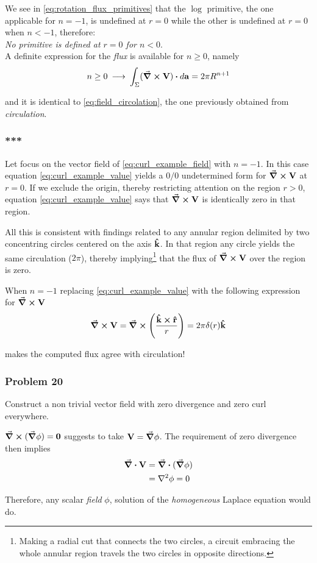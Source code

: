 We see in \ref{eq:rotation_flux_primitives} that the $\log$  primitive, the one applicable for $n = -1$, is  undefined at $r=0$ while the other is undefined at $r=0$ when $n < -1$, therefore:\\

\textit{No primitive is defined at $r=0$ for $n < 0$}. \\ 

A definite expression for the \textit{flux} is available for $n \geq 0$, namely 
\begin{equation}
n \geq 0 \: \longrightarrow \: \int_{\Sigma} (\curl{\vb{V}}) \vdot d\vb{a} = 2\pi R^{n+1} 
\label{eq:flux}
\end{equation}

and it is identical to \ref{eq:field_circolation}, the one previously obtained from \textit{circulation}. 

\subsubsection*{***}
Let focus on the vector field of \ref{eq:curl_example_field} with $n = -1$. In this case equation \ref{eq:curl_example_value} yields a $0/0$ undetermined form for $\curl{\vb{V}}$ at $r=0$. If we exclude the origin, thereby restricting attention on the region $r > 0$, equation \ref{eq:curl_example_value} says that $\curl{\vb{V}}$ is identically zero in that region. 

All this is consistent with findings related to any annular region delimited by two concentring circles centered on the axis $\vu{k}$. In that region any circle yields the same circulation ($2\pi$), thereby implying\footnote{Making a radial cut that connects the two circles, a circuit embracing the whole annular region travels the two circles in opposite directions.} that the flux of $\curl{\vb{V}}$ over the region is zero.

When $n = -1$ replacing \ref{eq:curl_example_value} with the following expression for $\curl{\vb{V}}$ 
\begin{equation}
\curl{\vb{V}} = \curl{ \left( \frac{\vu{k} \cross \vu{r}}{r} \right) } = 2\pi \delta(r) \vu{k}
\label{eq:flux}
\end{equation}

makes the computed flux agree with circulation! 

\subsubsection*{Problem 20}
Construct a non trivial vector field with zero divergence and zero curl everywhere.

$\curl{(\grad{\phi})} = \vb{0}$ suggests to take $\vb{V} = \grad{\phi}$. The requirement of zero divergence then implies 
\begin{equation*}
\begin{aligned}
\div{\vb{V}} &= \div{(\grad{\phi})} \\
             &= \laplacian{\phi} = 0 
\end{aligned}
\end{equation*}

Therefore, any scalar \textit{field} $\phi$, solution of the \textit{homogeneous} Laplace equation would do. 

